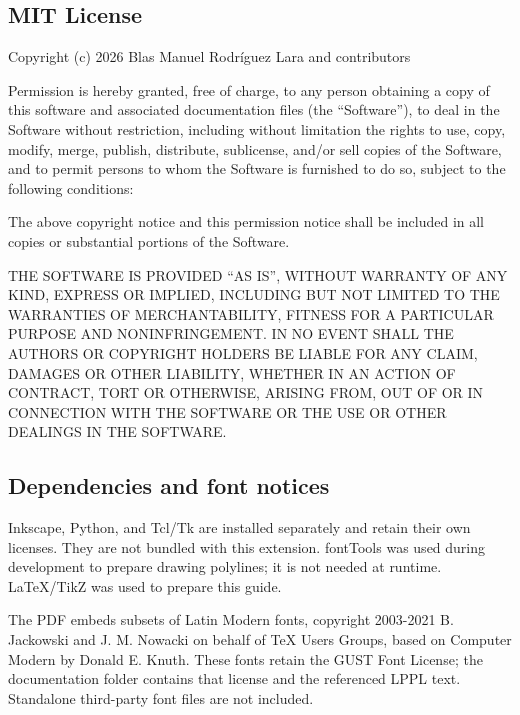 \documentclass[11pt,a4paper]{article}
\begin{document}
\subsection*{MIT License}
{\small
Copyright (c) 2026 Blas Manuel Rodríguez Lara and contributors

Permission is hereby granted, free of charge, to any person obtaining a copy
of this software and associated documentation files (the ``Software''), to deal
in the Software without restriction, including without limitation the rights
to use, copy, modify, merge, publish, distribute, sublicense, and/or sell
copies of the Software, and to permit persons to whom the Software is
furnished to do so, subject to the following conditions:

The above copyright notice and this permission notice shall be included in all
copies or substantial portions of the Software.

THE SOFTWARE IS PROVIDED ``AS IS'', WITHOUT WARRANTY OF ANY KIND, EXPRESS OR
IMPLIED, INCLUDING BUT NOT LIMITED TO THE WARRANTIES OF MERCHANTABILITY,
FITNESS FOR A PARTICULAR PURPOSE AND NONINFRINGEMENT. IN NO EVENT SHALL THE
AUTHORS OR COPYRIGHT HOLDERS BE LIABLE FOR ANY CLAIM, DAMAGES OR OTHER
LIABILITY, WHETHER IN AN ACTION OF CONTRACT, TORT OR OTHERWISE, ARISING FROM,
OUT OF OR IN CONNECTION WITH THE SOFTWARE OR THE USE OR OTHER DEALINGS IN THE
SOFTWARE.
}

\subsection*{Dependencies and font notices}
Inkscape, Python, and Tcl/Tk are installed separately and retain their own licenses. They are not bundled with this extension. fontTools was used during development to prepare drawing polylines; it is not needed at runtime. LaTeX/TikZ was used to prepare this guide.

The PDF embeds subsets of Latin Modern fonts, copyright 2003-2021 B. Jackowski and J. M. Nowacki on behalf of TeX Users Groups, based on Computer Modern by Donald E. Knuth. These fonts retain the GUST Font License; the documentation folder contains that license and the referenced LPPL text. Standalone third-party font files are not included.
\end{document}
